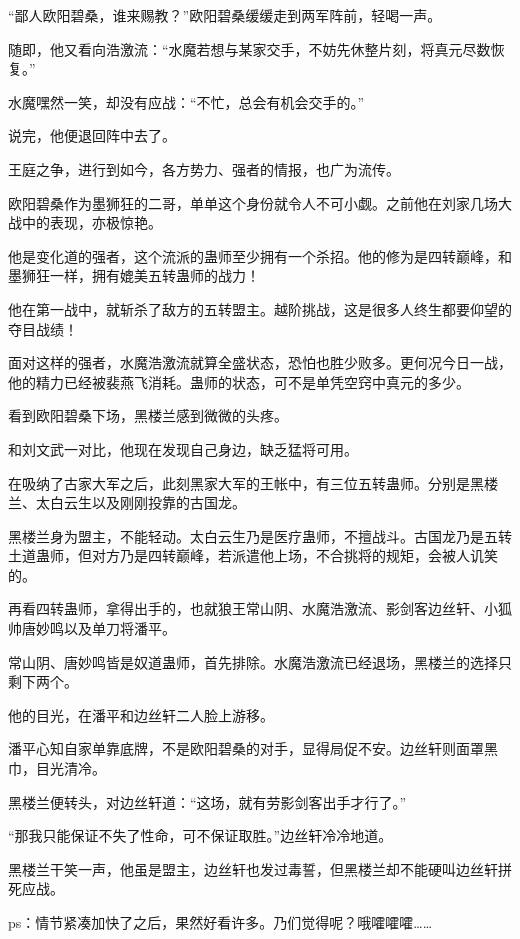 \begin{this_body}
“鄙人欧阳碧桑，谁来赐教？”欧阳碧桑缓缓走到两军阵前，轻喝一声。

随即，他又看向浩激流：“水魔若想与某家交手，不妨先休整片刻，将真元尽数恢复。”

水魔嘿然一笑，却没有应战：“不忙，总会有机会交手的。”

说完，他便退回阵中去了。

王庭之争，进行到如今，各方势力、强者的情报，也广为流传。

欧阳碧桑作为墨狮狂的二哥，单单这个身份就令人不可小觑。之前他在刘家几场大战中的表现，亦极惊艳。

他是变化道的强者，这个流派的蛊师至少拥有一个杀招。他的修为是四转巅峰，和墨狮狂一样，拥有媲美五转蛊师的战力！

他在第一战中，就斩杀了敌方的五转盟主。越阶挑战，这是很多人终生都要仰望的夺目战绩！

面对这样的强者，水魔浩激流就算全盛状态，恐怕也胜少败多。更何况今日一战，他的精力已经被裴燕飞消耗。蛊师的状态，可不是单凭空窍中真元的多少。

看到欧阳碧桑下场，黑楼兰感到微微的头疼。

和刘文武一对比，他现在发现自己身边，缺乏猛将可用。

在吸纳了古家大军之后，此刻黑家大军的王帐中，有三位五转蛊师。分别是黑楼兰、太白云生以及刚刚投靠的古国龙。

黑楼兰身为盟主，不能轻动。太白云生乃是医疗蛊师，不擅战斗。古国龙乃是五转土道蛊师，但对方乃是四转巅峰，若派遣他上场，不合挑将的规矩，会被人讥笑的。

再看四转蛊师，拿得出手的，也就狼王常山阴、水魔浩激流、影剑客边丝轩、小狐帅唐妙鸣以及单刀将潘平。

常山阴、唐妙鸣皆是奴道蛊师，首先排除。水魔浩激流已经退场，黑楼兰的选择只剩下两个。

他的目光，在潘平和边丝轩二人脸上游移。

潘平心知自家单靠底牌，不是欧阳碧桑的对手，显得局促不安。边丝轩则面罩黑巾，目光清冷。

黑楼兰便转头，对边丝轩道：“这场，就有劳影剑客出手才行了。”

“那我只能保证不失了性命，可不保证取胜。”边丝轩冷冷地道。

黑楼兰干笑一声，他虽是盟主，边丝轩也发过毒誓，但黑楼兰却不能硬叫边丝轩拼死应战。

ps：情节紧凑加快了之后，果然好看许多。乃们觉得呢？哦嚯嚯嚯……

\end{this_body}


